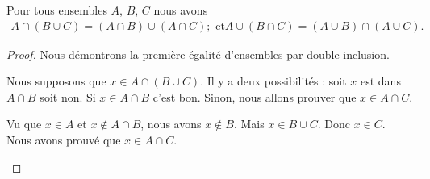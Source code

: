\begin{lemma}		\label{LEMooHPUNooPmViwi}
	Pour tous ensembles \( A\), \( B\), \( C\) nous avons
	\begin{gather}
		A\cap(B\cup C)=(A\cap B)\cup (A\cap C); \text{ et}
		A\cup(B\cap C)=(A\cup B)\cap (A\cup C).
	\end{gather}
\end{lemma}

\begin{proof}
	Nous démontrons la première égalité d'ensembles par double inclusion.
	\begin{subproof}
		Nous supposons que \( x\in A\cap(B\cup C)\). Il y a deux possibilités : soit \( x\) est dans \( A\cap B\) soit non. Si \( x\in A\cap B\) c'est bon. Sinon, nous allons prouver que \( x\in A\cap C\).

		Vu que \( x\in A\) et \( x\not\in A\cap B\), nous avons \( x\not\in B\). Mais \( x\in B\cup C\). Donc \( x\in C\). Nous avons prouvé que \( x\in A\cap C\).


\end{subproof}
\end{proof}
